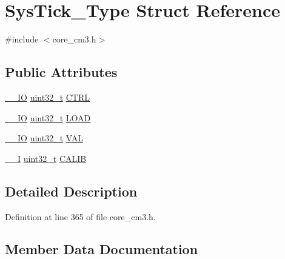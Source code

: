 \hypertarget{struct_sys_tick___type}{}\section{Sys\+Tick\+\_\+\+Type Struct Reference}
\label{struct_sys_tick___type}


{\ttfamily \#include $<$core\+\_\+cm3.\+h$>$}

\subsection*{Public Attributes}
\begin{DoxyCompactItemize}
\item 
\hyperlink{group___c_m_s_i_s___c_m3__core__definitions_gaec43007d9998a0a0e01faede4133d6be}{\+\_\+\+\_\+\+IO} \hyperlink{_p_e___types_8h_a33594304e786b158f3fb30289278f5af}{uint32\+\_\+t} \hyperlink{struct_sys_tick___type_af2ad94ac83e5d40fc6e34884bc1bec5f}{C\+T\+RL}
\item 
\hyperlink{group___c_m_s_i_s___c_m3__core__definitions_gaec43007d9998a0a0e01faede4133d6be}{\+\_\+\+\_\+\+IO} \hyperlink{_p_e___types_8h_a33594304e786b158f3fb30289278f5af}{uint32\+\_\+t} \hyperlink{struct_sys_tick___type_ae7bc9d3eac1147f3bba8d73a8395644f}{L\+O\+AD}
\item 
\hyperlink{group___c_m_s_i_s___c_m3__core__definitions_gaec43007d9998a0a0e01faede4133d6be}{\+\_\+\+\_\+\+IO} \hyperlink{_p_e___types_8h_a33594304e786b158f3fb30289278f5af}{uint32\+\_\+t} \hyperlink{struct_sys_tick___type_a0997ff20f11817f8246e8f0edac6f4e4}{V\+AL}
\item 
\hyperlink{group___c_m_s_i_s___c_m3__core__definitions_gaf63697ed9952cc71e1225efe205f6cd3}{\+\_\+\+\_\+I} \hyperlink{_p_e___types_8h_a33594304e786b158f3fb30289278f5af}{uint32\+\_\+t} \hyperlink{struct_sys_tick___type_a9c9eda0ea6f6a7c904d2d75a6963e238}{C\+A\+L\+IB}
\end{DoxyCompactItemize}


\subsection{Detailed Description}


Definition at line 365 of file core\+\_\+cm3.\+h.



\subsection{Member Data Documentation}
